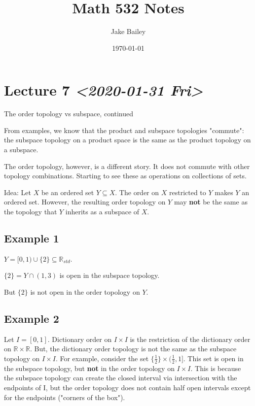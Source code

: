 \documentclass[11pt]{article}
\author{Jake Bailey}
\date{\today}
\title{Math 532 Notes}
\begin{document}
\maketitle
\tableofcontents

\section{Lecture 7 \textit{<2020-01-31 Fri>}}
\label{sec:orgd0974d2}

The order topology vs subspace, continued

From examples, we know that the product and subspace topologies
"commute": the subspace topology on a product space is the same as the
product topology on a subspace.

The order topology, however, is a different story. It does not commute
with other topology combinations. Starting to see these as operations
on collections of sets. 

Idea: Let \(X\) be an ordered set \(Y\subseteq X\). The order on \(X\)
restricted to \(Y\) makes \(Y\) an ordered set. However, the resulting
order topology on \(Y\) may \textbf{not} be the same as the topology that \(Y\)
inherits as a subspace of \(X\). 

\subsection{Example 1}
\label{sec:orgcdf5c54}
\(Y = [0,1)\cup\{2\} \subseteq \mathbb{R}_{std}\).  

\(\{2\} = Y\cap(1,3)\) is open in the subspace topology.

But \(\{2\}\) is not open in the order topology on \(Y\).

\subsection{Example 2}
\label{sec:org9c5b435}
Let \(I = [0,1]\). Dictionary order on \(I\times I\) is the restriction of
the dictionary order on \(\mathbb{R}\times\mathbb{R}\). But, the
dictionary order topology is not the same as the subspace topology on
\(I\times I\). For example, consider the set
\(\{\frac{1}{2}\}\times(\frac{1}{2},1]\). This set is open in the
subspace topology, but \textbf{not} in the order topology on \(I\times
I\). This is because the subspace topology can create the closed
interval via intersection with the endpoints of I, but the order
topology does not contain half open intervals except for the
endpoints ("corners of the box"). 
\end{document}
